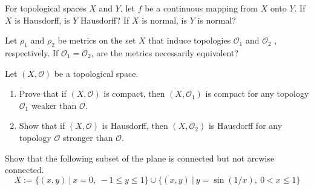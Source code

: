 \begin{problem}
	For topological spaces \( X \) and \( Y \), let \( f \) be a continuous mapping from \( X \) onto \( Y \). If \( X \) is Hausdorff, is \( Y \) Hausdorff? If \( X \) is normal, is \( Y \) is normal?  
\end{problem}

\begin{problem}
	Let \( \rho_1 \) and \( \rho_2 \) be metrics on the set \( X \) that induce topologies \( \mathcal{O}_1 \) and \( \mathcal{O}_2 \) , respectively. If \( \mathcal{O}_1 = \mathcal{O}_2 \), are the metrics necessarily equivalent? 
\end{problem}

\begin{problem}
	Let \( (X, \mathcal{O}) \) be a topological space. 
	\begin{enumerate}[a]
		\item Prove that if \( (X, \mathcal{O}) \) is compact, then \( (X, \mathcal{O}_1) \) is compact for any topology \( \mathcal{O}_1 \) weaker than \( \mathcal{O} \). 
		\item Show that if \( (X, \mathcal{O}) \) is Hausdorff, then \( (X, \mathcal{O}_2) \) is Hausdorff for any topology \( \mathcal{O} \)  stronger than \( \mathcal{O} \). 
	\end{enumerate}
\end{problem}

\begin{problem}
	Show that the following subset of the plane is connected but not arcwise connected. 
	\[ 
		X := \{ (x,y)\ |\ x = 0,\ -1 \leq y \leq 1 \} \cup \{ (x,y)\ |\ y = \sin (1/x),\ 0 < x \leq 1 \} 
	\]
\end{problem}

